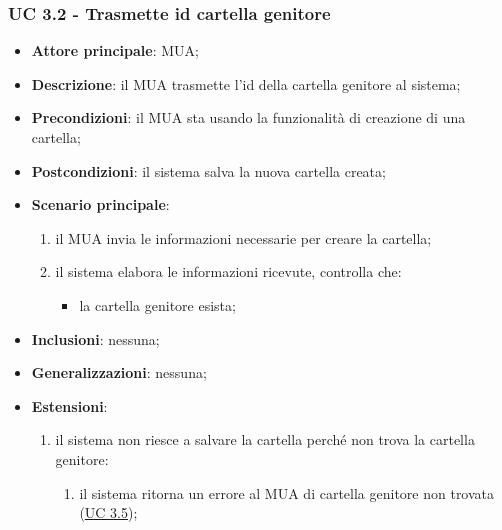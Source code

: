     \subsubsection{UC 3.2 - Trasmette id cartella genitore} \label{sec:UC3.2}
    \begin{itemize}
        \item \textbf{Attore principale}: MUA;
        \item \textbf{Descrizione}: il MUA trasmette l'id della cartella genitore al sistema;
        \item \textbf{Precondizioni}: il MUA sta usando la funzionalità di creazione di una cartella;
        \item \textbf{Postcondizioni}: il sistema salva la nuova cartella creata;
        \item \textbf{Scenario principale}:
            \begin{enumerate}
                \item il MUA invia le informazioni necessarie per creare la cartella;
                \item il sistema elabora le informazioni ricevute, controlla che:
                \begin{itemize}
                    \item la cartella genitore esista;
                \end{itemize}
            \end{enumerate}
        \item \textbf{Inclusioni}: nessuna;
        \item \textbf{Generalizzazioni}: nessuna;
        \item \textbf{Estensioni}:
            \begin{enumerate}[label=\alph*.]
                \item il sistema non riesce a salvare la cartella perché non trova la cartella genitore:
                \begin{enumerate}[label=\arabic*.]
                    \item il sistema ritorna un errore al MUA di cartella genitore non trovata (\hyperref[sec:UC3.5]{UC 3.5});
                \end{enumerate}
            \end{enumerate}
    \end{itemize}



